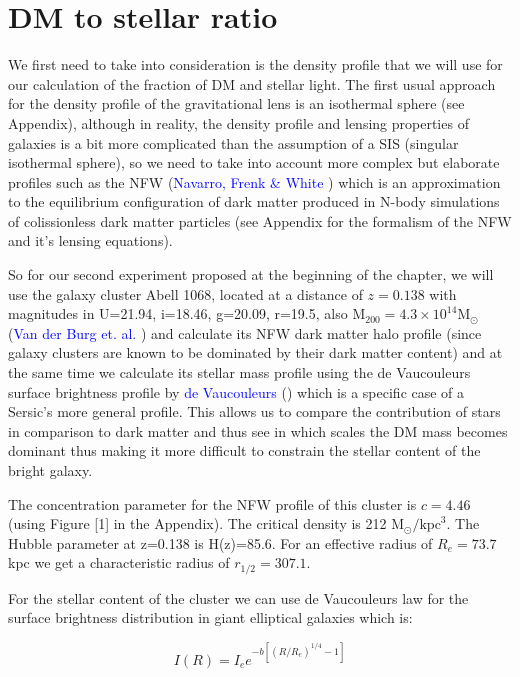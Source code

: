\section{DM to stellar ratio}

We first need to take into consideration is the density profile that we will use for our calculation of the fraction of DM and stellar light. The first usual approach for the density profile of the gravitational lens is an isothermal sphere (see Appendix), although in reality, the density profile and lensing properties of galaxies is a bit more complicated than the assumption of a SIS (singular isothermal sphere), so we need to take into account more complex but elaborate profiles such as the NFW (\textcolor{blue}{Navarro, Frenk \& White} \citeyear{Reference17}) which is an approximation to the equilibrium configuration of dark matter produced in N-body simulations of colissionless dark matter particles (see Appendix for the formalism of the NFW and it's lensing equations).

So for our second experiment proposed at the beginning of the chapter, we will use the galaxy cluster Abell 1068, located at a distance of $z=0.138$ with magnitudes in U=21.94, i=18.46, g=20.09, r=19.5, also $\text{M}_{200}=4.3\times 10^{14}\text{M}_{\odot}$ (\textcolor{blue}{Van der Burg et. al.} \citeyear{Reference2}) and calculate its NFW dark matter halo profile (since galaxy clusters are known to be dominated by their dark matter content) and at the same time we calculate its stellar mass profile using the de Vaucouleurs surface brightness profile by \textcolor{blue}{de Vaucouleurs} (\citeyear{Reference32}) which is a specific case of a Sersic's more general profile. This allows us to compare the contribution of stars in comparison to dark matter and thus see in which scales the DM mass becomes dominant thus making it more difficult to constrain the stellar content of the bright galaxy.

The concentration parameter for the NFW profile of this cluster is $c=4.46$ (using Figure [1] in the Appendix). The critical density is 212 $\text{M}_{\odot}/\text{kpc}^{3}$. The Hubble parameter at z=0.138 is H(z)=85.6. For an effective radius of $R_{e}=73.7$ kpc we get a characteristic radius of $r_{1/2}=307.1$.

For the stellar content of the cluster we can use de Vaucouleurs law for the surface brightness distribution in giant elliptical galaxies which is:

\begin{equation}
I(R)=I_{e}e^{-b\left[\left(R/R_{e}\right)^{1/4}-1\right]}
\end{equation}

